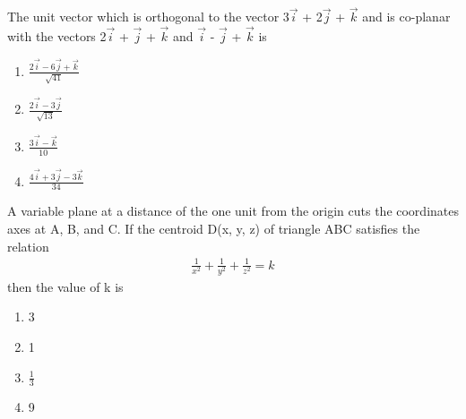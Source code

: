 \item The unit vector which is orthogonal to the vector 3$\overrightarrow{i}$ + 2$\overrightarrow{j}$ + $\overrightarrow{k}$ and is co-planar with the vectors 2$\overrightarrow{i}$ + $\overrightarrow{j}$ + $\overrightarrow{k}$ and $\overrightarrow{i}$ - $\overrightarrow{j}$ + $\overrightarrow{k}$ is
\begin{enumerate}
\item $\frac{2\overrightarrow{i} - 6\overrightarrow{j} + \overrightarrow{k}}{\sqrt{41}}$
\item $\frac{2\overrightarrow{i} - 3\overrightarrow{j}}{\sqrt{13}}$
\item $\frac{3\overrightarrow{i} - \overrightarrow{k}}{10}$
\item $\frac{4\overrightarrow{i} + 3\overrightarrow{j} - 3\overrightarrow{k}}{34}$
\end{enumerate}

\item A variable plane at a distance of the one unit from the origin cuts the coordinates axes at A, B, and C. If the centroid D(x, y, z) of triangle ABC satisfies the relation
\begin{align*}
\frac{1}{x^{2}} + \frac{1}{y^{2}} + \frac{1}{z^{2}} = k
\end{align*}
then the value of k is
\begin{enumerate}
\item 3
\item 1
\item $\frac{1}{3}$
\item 9
\end{enumerate}

